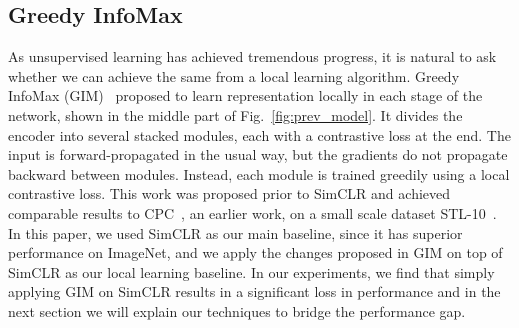 \subsection{Greedy InfoMax}
\label{sec:gim}
As unsupervised learning has achieved tremendous progress, it is natural to ask whether we can
achieve the same from a local learning algorithm. Greedy InfoMax (GIM)~\cite{e2e2e} proposed to
learn representation locally in each stage of the network, shown in the middle part of
Fig.~\ref{fig:prev_model}. It divides the encoder into several stacked modules, each with a
contrastive loss at the end. The input is forward-propagated in the usual way, but the gradients do
not propagate backward between modules. Instead, each module is trained greedily using a local
contrastive loss. This work was proposed prior to SimCLR and achieved comparable results to
CPC~\cite{cpc}, an earlier work, on a small scale dataset STL-10~\cite{coates2011analysis}. In this
paper, we used SimCLR as our main baseline, since it has superior performance on ImageNet, and we
apply the changes proposed in GIM on top of SimCLR as our local learning baseline. In our
experiments, we find that simply applying GIM on SimCLR results in a significant loss in performance
and in the next section we will explain our techniques to bridge the performance gap.